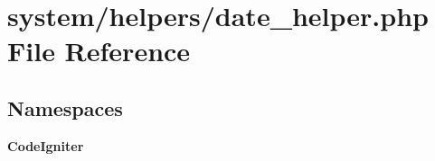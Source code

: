 \section{system/helpers/date\-\_\-helper.php File Reference}
\label{date__helper_8php}
\subsection*{Namespaces}
\begin{DoxyCompactItemize}
\item 
{\bf Code\-Igniter}
\end{DoxyCompactItemize}
